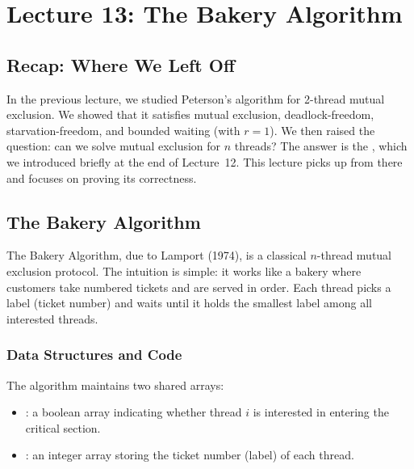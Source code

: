 
\newtheorem{theorem}{Theorem}[chapter]
\newtheorem{lemma}[theorem]{Lemma}
\newenvironment{proof}[1][Proof]{%
  \par\noindent\textit{#1.}\enspace\ignorespaces
}{%
  \hfill$\square$\par\medskip
}

\chapter{Lecture 13: The Bakery Algorithm}

\section{Recap: Where We Left Off}

In the previous lecture, we studied Peterson's algorithm for 2-thread mutual
exclusion. We showed that it satisfies mutual exclusion, deadlock-freedom,
starvation-freedom, and bounded waiting (with $r = 1$). We then raised the
question: can we solve mutual exclusion for $n$ threads? The answer is the
, which we introduced briefly at the end of Lecture~12.
This lecture picks up from there and focuses on proving its correctness.

\section{The Bakery Algorithm}

The Bakery Algorithm, due to Lamport (1974), is a classical $n$-thread mutual
exclusion protocol. The intuition is simple: it works like a bakery where
customers take numbered tickets and are served in order. Each thread picks a
label (ticket number) and waits until it holds the smallest label among all
interested threads.

\subsection{Data Structures and Code}

The algorithm maintains two shared arrays:
\begin{itemize}[nosep]
  \item {}: a boolean array indicating whether thread $i$
        is interested in entering the critical section.
  \item {}: an integer array storing the ticket number
        (label) of each thread.
\end{itemize}

